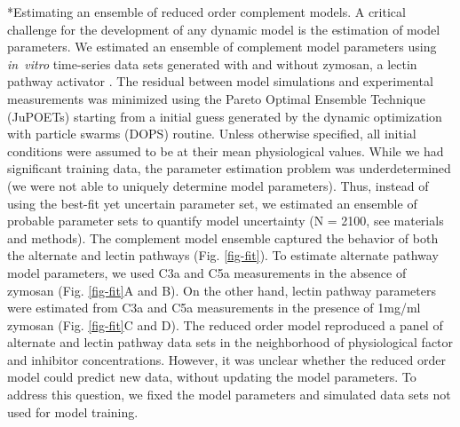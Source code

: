 \documentclass[12pt]{article}
\makeatletter
\renewcommand\subsection{\@startsection
	{subsection}{2}{0mm}
	{-0.05in}
	{-0.5\baselineskip}
	{\normalfont\normalsize\bfseries}}
\makeatother
\begin{document}
\subsection*{Estimating an ensemble of reduced order complement models.}
A critical challenge for the development of any dynamic model is the estimation of model parameters.
We estimated an ensemble of complement model parameters using \textit{in~vitro} time-series data sets generated with and without zymosan, a lectin pathway activator \cite{morad2015time}.
The residual between model simulations and experimental measurements was minimized using the Pareto Optimal Ensemble Technique (JuPOETs) \cite{JuPOETs-BioArXiv}
starting from a initial guess generated by the dynamic optimization with particle swarms (DOPS) routine.
Unless otherwise specified, all initial conditions were assumed to be at their mean physiological values.
While we had significant training data, the parameter estimation problem was underdetermined (we were not able to uniquely determine model parameters).
Thus, instead of using the best-fit yet uncertain parameter set, we estimated an ensemble of probable parameter sets to quantify model uncertainty
(N = 2100, see materials and methods).
The complement model ensemble captured the behavior of both the alternate and lectin pathways (Fig. \ref{fig-fit}).
To estimate alternate pathway model parameters, we used C3a and C5a measurements in the absence of zymosan (Fig. \ref{fig-fit}A and B).
On the other hand, lectin pathway parameters were estimated from C3a and C5a measurements in the presence of 1mg/ml zymosan (Fig. \ref{fig-fit}C and D).
The reduced order model reproduced a panel of alternate and lectin pathway data sets in the neighborhood of physiological factor and inhibitor concentrations.
However, it was unclear whether the reduced order model could predict new data, without updating the model parameters.
To address this question, we fixed the model parameters and simulated data sets not used for model training.

\end{document}
